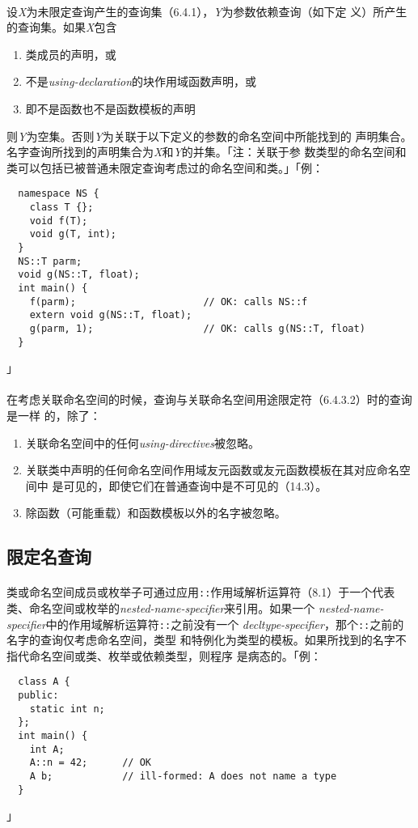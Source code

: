 \paragraph{}
设\textit{X}为未限定查询产生的查询集（6.4.1），\textit{Y}为参数依赖查询（如下定
义）所产生的查询集。如果\textit{X}包含
\begin{enumerate}
  \item{类成员的声明，或}
  \item{不是\textit{using-declaration}的块作用域函数声明，或}
  \item{即不是函数也不是函数模板的声明}
\end{enumerate}
则\textit{Y}为空集。否则\textit{Y}为关联于以下定义的参数的命名空间中所能找到的
声明集合。名字查询所找到的声明集合为\textit{X}和\textit{Y}的并集。「注：关联于参
数类型的命名空间和类可以包括已被普通未限定查询考虑过的命名空间和类。」「例：
\begin{lstlisting}
  namespace NS {
    class T {};
    void f(T);
    void g(T, int);
  }
  NS::T parm;
  void g(NS::T, float);
  int main() {
    f(parm);                      // OK: calls NS::f
    extern void g(NS::T, float);
    g(parm, 1);                   // OK: calls g(NS::T, float)
  }
\end{lstlisting}」

\paragraph{}
在考虑关联命名空间的时候，查询与关联命名空间用途限定符（6.4.3.2）时的查询是一样
的，除了：
\begin{enumerate}
  \item{关联命名空间中的任何\textit{using-directives}被忽略。}
  \item{关联类中声明的任何命名空间作用域友元函数或友元函数模板在其对应命名空间中
    是可见的，即使它们在普通查询中是不可见的（14.3）。}
  \item{除函数（可能重载）和函数模板以外的名字被忽略。}
\end{enumerate}

\subsection{限定名查询}
\paragraph{}
类或命名空间成员或枚举子可通过应用\texttt{::}作用域解析运算符（8.1）于一个代表
类、命名空间或枚举的\textit{nested-name-specifier}来引用。如果一个
\textit{nested-name-specifier}中的作用域解析运算符\texttt{::}之前没有一个
\textit{decltype-specifier}，那个\texttt{::}之前的名字的查询仅考虑命名空间，类型
和特例化为类型的模板。如果所找到的名字不指代命名空间或类、枚举或依赖类型，则程序
是病态的。「例：
\begin{lstlisting}
  class A {
  public:
    static int n;
  };
  int main() {
    int A;
    A::n = 42;      // OK
    A b;            // ill-formed: A does not name a type
  }
\end{lstlisting}」

